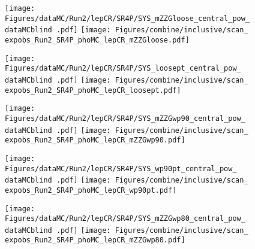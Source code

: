 \begin{figure}
  \centering
  \texttt{[image: Figures/dataMC/Run2/lepCR/SR4P/SYS\_mZZGloose\_central\_pow\_\\dataMCblind .pdf]}
  \hfill
  \texttt{[image: Figures/combine/inclusive/scan\_\\expobs\_Run2\_SR4P\_phoMC\_lepCR\_mZZGloose.pdf]}
  \caption{}
  \label{fig:scan_Run2_SR4P_phoMC_lepCR_mZZGloose}
\end{figure}

\begin{figure}
  \centering
  \texttt{[image: Figures/dataMC/Run2/lepCR/SR4P/SYS\_loosept\_central\_pow\_\\dataMCblind .pdf]}
  \hfill
  \texttt{[image: Figures/combine/inclusive/scan\_\\expobs\_Run2\_SR4P\_phoMC\_lepCR\_loosept.pdf]}
  \caption{}
  \label{fig:scan_Run2_SR4P_phoMC_lepCR_loosept}
\end{figure}

\begin{figure}
  \centering
  \texttt{[image: Figures/dataMC/Run2/lepCR/SR4P/SYS\_mZZGwp90\_central\_pow\_\\dataMCblind .pdf]}
  \hfill
  \texttt{[image: Figures/combine/inclusive/scan\_\\expobs\_Run2\_SR4P\_phoMC\_lepCR\_mZZGwp90.pdf]}
  \caption{}
  \label{fig:scan_Run2_SR4P_phoMC_lepCR_mZZGwp90}
\end{figure}

\begin{figure}
  \centering
  \texttt{[image: Figures/dataMC/Run2/lepCR/SR4P/SYS\_wp90pt\_central\_pow\_\\dataMCblind .pdf]}
  \hfill
  \texttt{[image: Figures/combine/inclusive/scan\_\\expobs\_Run2\_SR4P\_phoMC\_lepCR\_wp90pt.pdf]}
  \caption{}
  \label{fig:scan_Run2_SR4P_phoMC_lepCR_wp90pt}
\end{figure}

\begin{figure}
  \texttt{[image: Figures/dataMC/Run2/lepCR/SR4P/SYS\_mZZGwp80\_central\_pow\_\\dataMCblind .pdf]}
  \hfill
  \centering
  \texttt{[image: Figures/combine/inclusive/scan\_\\expobs\_Run2\_SR4P\_phoMC\_lepCR\_mZZGwp80.pdf]}
  \caption{}
  \label{fig:scan_Run2_SR4P_phoMC_lepCR_mZZGwp80}
\end{figure}

